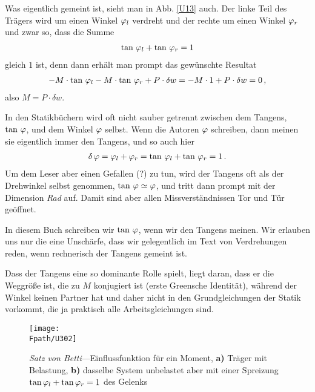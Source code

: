 Was eigentlich gemeint ist, sieht man in Abb. \ref{U13} auch. Der linke Teil des Tr\"{a}gers wird um einen Winkel $\varphi_l$ verdreht und der rechte um einen Winkel $\varphi_r$ und zwar so, dass die Summe
\begin{align}
\tan\,\varphi_l +\tan\,\varphi_r  = 1
\end{align}
gleich $1$ ist, denn dann erh\"{a}lt man prompt das gew\"{u}nschte Resultat
\begin{align}
- M \cdot \tan\,\varphi_l  - M \cdot\tan\,\varphi_r + P \cdot \delta w = - M \cdot 1 + P \cdot \delta w = 0\,,
\end{align}
also $M = P \cdot\delta w$.

In den Statikb\"{u}chern wird oft nicht sauber getrennt zwischen dem Tangens, $\tan\,\varphi$, und dem Winkel $\varphi$ selbst. Wenn die Autoren $\varphi$ schreiben, dann meinen sie eigentlich immer den Tangens, und so auch hier
\begin{align}
\delta\,\varphi = \varphi_l + \varphi_r = \tan\,\varphi_l +\tan\,\varphi_r  = 1\,.
\end{align}
Um dem Leser aber einen Gefallen (?) zu tun, wird der Tangens oft als der Drehwinkel selbst genommen, $ \tan\,\varphi \simeq \varphi $, und tritt dann prompt mit der Dimension {\em Rad \/} auf. Damit sind aber allen Missverst\"{a}ndnissen Tor und T\"{u}r ge\"{o}ffnet.

In diesem Buch schreiben wir $\tan\,\varphi$, wenn wir den Tangens meinen. Wir erlauben uns nur die eine Unsch\"{a}rfe, dass wir gelegentlich im Text von Verdrehungen reden, wenn rechnerisch der Tangens gemeint ist.

Dass der Tangens eine so dominante Rolle spielt, liegt daran, dass er die Weggr\"{o}{\ss}e ist, die  zu $M$ konjugiert ist (erste Greensche Identit\"{a}t), w\"{a}hrend der Winkel keinen \glq Partner\grq{} hat und daher nicht in den Grundgleichungen der Statik vorkommt, die ja praktisch alle Arbeitsgleichungen sind.

\begin{figure}[tbp]
\centering
\if {} \sidecaption \fi
\texttt{[image: \\Fpath/U302]}
\caption{{\em Satz von Betti\/}---Einflussfunktion f\"{u}r ein Moment, \textbf{ a)} Tr\"{a}ger mit Belastung, \textbf{ b)} dasselbe System unbelastet aber mit einer Spreizung $\tan \varphi_l + \tan \varphi_r = 1$ des Gelenks} \label{U302}
\end{figure}%

